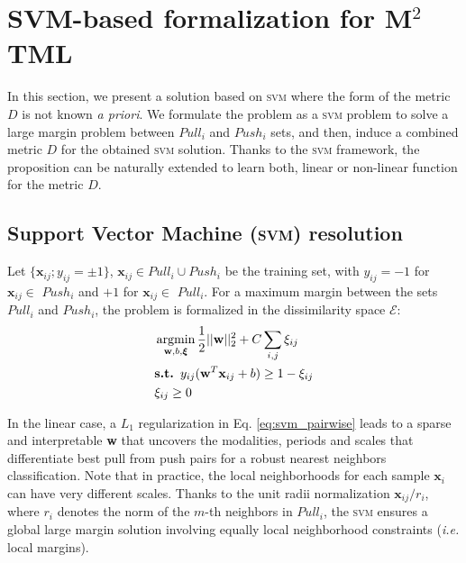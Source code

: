 \section{SVM-based formalization for M$^2$TML}
In this section, we present a solution based on \textsc{svm} where the form of the metric $D$ is not known \textit{a priori}. We formulate the problem as a \textsc{svm} problem to solve a large margin problem between $Pull_i$ and $Push_i$ sets, and then, induce a combined metric $D$ for the obtained \textsc{svm} solution. 
Thanks to the \textsc{svm} framework, the proposition can be naturally extended to learn both, linear or non-linear function for the metric $D$.

\subsection{Support Vector Machine (\textsc{svm}) resolution}
Let $\{\textbf{x}_{ij}; y_{ij} = \pm 1\}$, $\textbf{x}_{ij} \in Pull_i \cup Push_i$ be the training set, with $y_{ij} = -1$ for $\textbf{x}_{ij} \in$ $Push_i$ and $+1$ for $\textbf{x}_{ij} \in$ $Pull_i$. For a maximum margin between the sets $Pull_i$ and $Push_i$, the problem is formalized in the dissimilarity space $\mathcal{E}$:
\begin{equation}
	\begin{aligned}
	& \argmin_{\textbf{w},b,\boldsymbol{\xi}} \frac{1}{2}||\textbf{w}||_2^2 + C \sum\limits_{i,j} \xi_{ij} \label{eq:svm_pairwise}\\
	&\textbf{s.t. } y_{ij}(\textbf{w}^T \textbf{x}_{ij} + b) \geq 1-\xi_{ij} \\
	&\xi_{ij} \geq 0
	\end{aligned}
\end{equation}

\noindent In the linear case, a $L_1$ regularization in Eq. \ref{eq:svm_pairwise} leads to a sparse and interpretable \textbf{w} that uncovers the modalities, periods and scales that differentiate best pull from push pairs for a robust nearest neighbors classification.
Note that in practice, the local neighborhoods for each sample $\textbf{x}_i$ can have very different scales. Thanks to the unit radii normalization $\textbf{x}_{ij}/r_i$, where $r_i$ denotes the norm of the $m$-th neighbors in $Pull_i$, the \textsc{svm} ensures a global large margin solution involving equally local neighborhood constraints (\textit{i.e.} local margins).

